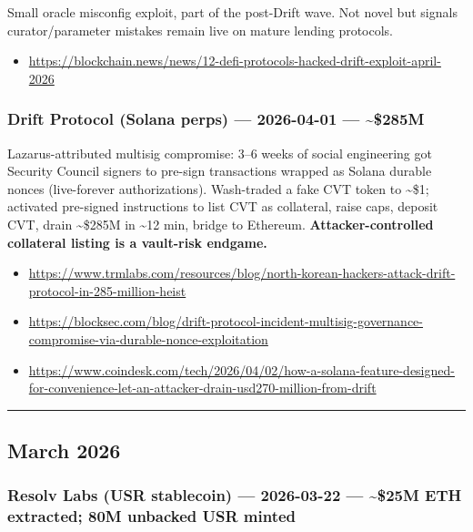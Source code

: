 Small oracle misconfig exploit, part of the post-Drift wave. Not novel but signals curator/parameter mistakes remain live on mature lending protocols.

\begin{itemize}
\tightlist
\item
  \url{https://blockchain.news/news/12-defi-protocols-hacked-drift-exploit-april-2026}
\end{itemize}

\subsubsection{Drift Protocol (Solana perps) --- 2026-04-01 --- \textasciitilde\$285M}\label{drift-protocol-solana-perps-2026-04-01-285m}

Lazarus-attributed multisig compromise: 3--6 weeks of social engineering got Security Council signers to pre-sign transactions wrapped as Solana durable nonces (live-forever authorizations). Wash-traded a fake CVT token to \textasciitilde\$1; activated pre-signed instructions to list CVT as collateral, raise caps, deposit CVT, drain \textasciitilde\$285M in \textasciitilde12 min, bridge to Ethereum. \textbf{Attacker-controlled collateral listing is a vault-risk endgame.}

\begin{itemize}
\tightlist
\item
  \url{https://www.trmlabs.com/resources/blog/north-korean-hackers-attack-drift-protocol-in-285-million-heist}
\item
  \url{https://blocksec.com/blog/drift-protocol-incident-multisig-governance-compromise-via-durable-nonce-exploitation}
\item
  \url{https://www.coindesk.com/tech/2026/04/02/how-a-solana-feature-designed-for-convenience-let-an-attacker-drain-usd270-million-from-drift}
\end{itemize}

\begin{center}\rule{0.5\linewidth}{0.5pt}\end{center}

\subsection{March 2026}\label{march-2026}

\subsubsection{Resolv Labs (USR stablecoin) --- 2026-03-22 --- \textasciitilde\$25M ETH extracted; 80M unbacked USR minted}\label{resolv-labs-usr-stablecoin-2026-03-22-25m-eth-extracted-80m-unbacked-usr-minted}

